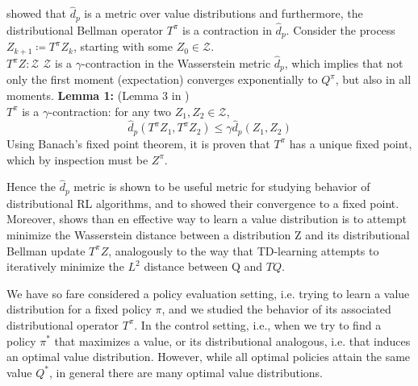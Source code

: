 \cite{Bellemare2017} showed that $\hat{d}_p$ is a metric over value distributions
and furthermore, the distributional
Bellman operator $T^\pi$ is a contraction in $\hat{d}_p$.
Consider the process $Z_{k+1} \coloneqq T^\pi Z_{k}$, starting with some $Z_{0} \in \mathcal{Z}$. \\
$T^\pi Z: \mathcal{Z} $ \ra $\mathcal{Z}$ is a $\gamma$-contraction in the Wasserstein
metric $\hat{d}_p$, which implies that 
not only the first moment (expectation) converges exponentially to $ Q^\pi$, but also in
 all moments.\newline
\textbf{Lemma 1:} (Lemma 3 in \cite{Bellemare2017} )\\
$T^\pi$ is a $\gamma$-contraction: for any two $Z_1, Z_2 \in \mathcal{Z}$,
\begin{equation}
    \hat{d}_p(T^\pi Z_1, T^\pi Z_2) \leq \gamma \hat{d}_p(Z_1,Z_2)
\end{equation}
Using Banach's fixed point theorem, it is proven that $T^\pi$ has a unique fixed point,
which by inspection must be $Z^\pi$.

Hence the $\hat{d}_p$ metric is shown to be useful metric for studying behavior of
distributional RL algorithms, and to showed their convergence to a fixed point.
Moreover, shows than en effective way to learn a value distribution is to attempt minimize
the Wasserstein distance between a distribution Z and its distributional Bellman update
$T^\pi Z$, analogously to the way that TD-learning attempts to iteratively minimize
the $L^2$ distance between Q and $TQ$.

We have so fare considered a policy evaluation setting, i.e. trying to learn a value
distribution for a fixed policy $\pi $, and we studied
the behavior of its associated distributional operator $T^\pi $.
In the control setting, i.e., when we try to find a policy $\pi^{*} $ that maximizes a
value, or its distributional analogous, i.e. that
induces an optimal value distribution. However, while all optimal policies attain the
same value $Q^{*}$, in general there are
many optimal value distributions.

